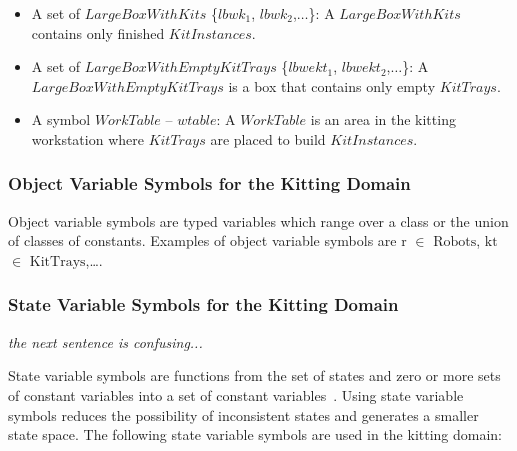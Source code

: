 \documentclass[a4paper, 10pt, conference]{ieeeconf}      %
\begin{document}
\begin{itemize}
\item A set of $LargeBoxWithKits$ \{$lbwk_1$, $lbwk_2$,$\dots$\}: A $LargeBoxWithKits$ contains only finished $KitInstances$.

\item A set of $LargeBoxWithEmptyKitTrays$ \{$lbwekt_1$, $lbwekt_2$,$\dots$\}: A $LargeBoxWithEmptyKitTrays$ is a box that contains only empty $KitTrays$.

\item A symbol $WorkTable$ -- $wtable$: A $WorkTable$ is an area in the kitting workstation where $KitTrays$ are placed to build $KitInstances$.
\end{itemize}

\subsubsection{Object Variable Symbols for the Kitting Domain}
Object variable symbols are typed variables which range over a class or the union of classes of constants. Examples of object variable symbols are $\mathrm{r}$ $\in$ $\mathrm{Robots}$, $\mathrm{kt}$ $\in$ $\mathrm{KitTrays}$,\ldots.

\subsubsection{State Variable Symbols for the Kitting Domain}
{\it the next sentence is confusing...}

State variable symbols are functions from the set of states and zero or more sets of constant variables into a set of constant variables~\cite{NAU.2004}. Using state variable symbols reduces the possibility of inconsistent states and generates a smaller state space. The following state variable symbols are used in the kitting domain:
\end{document}
